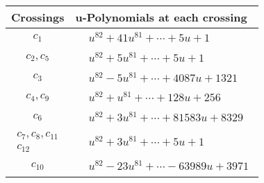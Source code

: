 \documentclass[1p]{elsarticle_modified}
\theoremstyle{definition}
\begin{document}
\begin{tabular}{m{50pt}|m{274pt}}
Crossings & \hspace{64pt}u-Polynomials at each crossing \\
\hline $$\begin{aligned}c_{1}\end{aligned}$$&$\begin{aligned}
&u^{82}+41 u^{81}+\cdots+5 u+1
\end{aligned}$\\
\hline $$\begin{aligned}c_{2},c_{5}\end{aligned}$$&$\begin{aligned}
&u^{82}+5 u^{81}+\cdots+5 u+1
\end{aligned}$\\
\hline $$\begin{aligned}c_{3}\end{aligned}$$&$\begin{aligned}
&u^{82}-5 u^{81}+\cdots+4087 u+1321
\end{aligned}$\\
\hline $$\begin{aligned}c_{4},c_{9}\end{aligned}$$&$\begin{aligned}
&u^{82}+u^{81}+\cdots+128 u+256
\end{aligned}$\\
\hline $$\begin{aligned}c_{6}\end{aligned}$$&$\begin{aligned}
&u^{82}+3 u^{81}+\cdots+81583 u+8329
\end{aligned}$\\
\hline $$\begin{aligned}c_{7},c_{8},c_{11}\\c_{12}\end{aligned}$$&$\begin{aligned}
&u^{82}+3 u^{81}+\cdots+5 u+1
\end{aligned}$\\
\hline $$\begin{aligned}c_{10}\end{aligned}$$&$\begin{aligned}
&u^{82}-23 u^{81}+\cdots-63989 u+3971
\end{aligned}$\\
\hline
\end{tabular}\\~\\
\end{document}
